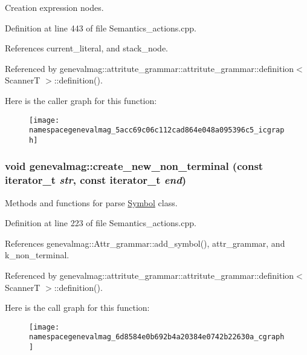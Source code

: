 Creation expression nodes. 

Definition at line 443 of file Semantics\_\-actions.cpp.

References current\_\-literal, and stack\_\-node.

Referenced by genevalmag::attritute\_\-grammar::attritute\_\-grammar::definition$<$ ScannerT $>$::definition().

Here is the caller graph for this function:\nopagebreak
\begin{figure}[H]
\begin{center}
\leavevmode
\texttt{[image: namespacegenevalmag\_5acc69c06c112cad864e048a095396c5\_icgraph]}
\end{center}
\end{figure}
\hypertarget{namespacegenevalmag_6d8584e0b692b4a20384e0742b22630a}{
\subsubsection[{create\_\-new\_\-non\_\-terminal}]{\setlength{\rightskip}{0pt plus 5cm}void genevalmag::create\_\-new\_\-non\_\-terminal (const iterator\_\-t {\em str}, \/  const iterator\_\-t {\em end})}}
\label{namespacegenevalmag_6d8584e0b692b4a20384e0742b22630a}


Methods and functions for parse \hyperlink{classgenevalmag_1_1Symbol}{Symbol} class. 

Definition at line 223 of file Semantics\_\-actions.cpp.

References genevalmag::Attr\_\-grammar::add\_\-symbol(), attr\_\-grammar, and k\_\-non\_\-terminal.

Referenced by genevalmag::attritute\_\-grammar::attritute\_\-grammar::definition$<$ ScannerT $>$::definition().

Here is the call graph for this function:\nopagebreak
\begin{figure}[H]
\begin{center}
\leavevmode
\texttt{[image: namespacegenevalmag\_6d8584e0b692b4a20384e0742b22630a\_cgraph]}
\end{center}
\end{figure}


